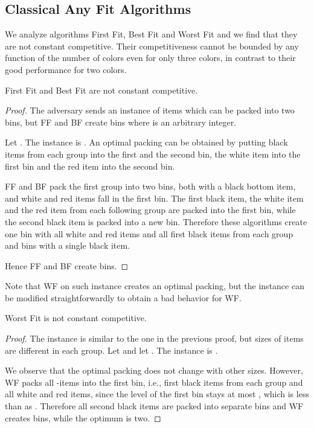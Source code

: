 \documentclass[11pt,a4paper]{article}
\begin{document}
\subsection{Classical Any Fit Algorithms} \label{sec:AFalgsOnColors}
We analyze algorithms First Fit, Best Fit and Worst Fit and we find that
they are not constant competitive.  Their competitiveness cannot be
bounded by any function of the number of colors even for only three
colors, in contrast to their good performance for two colors.

\begin{proposition}
First Fit and Best Fit are not constant competitive.
\end{proposition}

\begin{proof}
The adversary sends an instance of  items which can be packed into two bins,
but FF and BF create  bins where  is an arbitrary integer.

Let . The instance is .
An optimal packing can be obtained by putting black items from each group into the first and the second bin,
the white item into the first bin and the red item into the second bin.

FF and BF pack the first group into two bins, both with a black bottom item,
and white and red items fall in the first bin.
The first black item, the white item and the red item from each following group are packed into the first bin,
while the second black item is packed into a new bin.
Therefore these algorithms create one bin with all white and red items and all first black items from each group and  bins with a single black item.

Hence FF and BF create  bins.
\end{proof}

Note that WF on such instance creates an optimal packing,
but the instance can be modified straightforwardly to obtain a bad behavior for WF.

\begin{proposition}
Worst Fit is not constant competitive.
\end{proposition}

\begin{proof}
The instance is similar to the one in the previous proof, but sizes of items are different in each group.
Let  and let . The instance is
.
 
We observe that the optimal packing does not change with other sizes.
However, WF packs all -items into the first bin, i.e.,
first black items from each group and all white and red items,
since the level of the first bin stays at most ,
which is less than  as .
Therefore all second black items are packed into separate bins
and WF creates  bins, while the optimum is two.
\end{proof}
\end{document}
